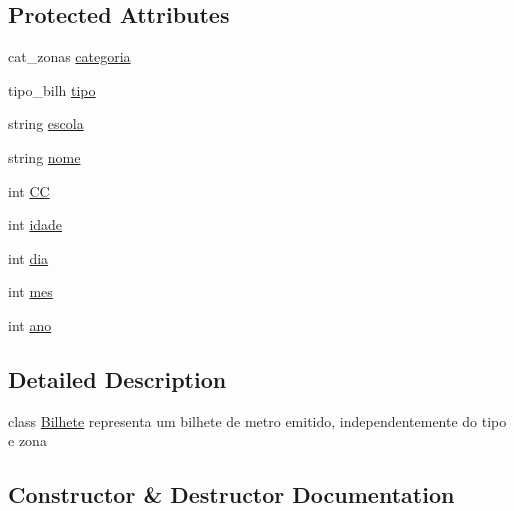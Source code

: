 \subsection*{Protected Attributes}
\begin{DoxyCompactItemize}
\item 
cat\+\_\+zonas \mbox{\hyperlink{class_bilhete_a964746f80b1342fc53512073b5588c1a}{categoria}}
\item 
tipo\+\_\+bilh \mbox{\hyperlink{class_bilhete_a811d01c91c9ca7e43ca05b4de7cb053d}{tipo}}
\item 
string \mbox{\hyperlink{class_bilhete_a5129f08ea3f4b9ec1c77be2b5377c32f}{escola}}
\item 
string \mbox{\hyperlink{class_bilhete_a6c473f8854c6980af895803cfe742279}{nome}}
\item 
int \mbox{\hyperlink{class_bilhete_a3272957b6efbae819c70320b40823e46}{CC}}
\item 
int \mbox{\hyperlink{class_bilhete_a5cd410905c9eeb3e0281df97ddc6b69a}{idade}}
\item 
int \mbox{\hyperlink{class_bilhete_ad3dbd72118947c8ebb9d2a1a9e6bc3eb}{dia}}
\item 
int \mbox{\hyperlink{class_bilhete_ad654ce2fb56eca0738e6994774bb9d75}{mes}}
\item 
int \mbox{\hyperlink{class_bilhete_a28c57c28b91d9d751cb8292911af4b00}{ano}}
\end{DoxyCompactItemize}


\subsection{Detailed Description}
class \mbox{\hyperlink{class_bilhete}{Bilhete}} representa um bilhete de metro emitido, independentemente do tipo e zona 

\subsection{Constructor \& Destructor Documentation}
\mbox{\label{class_bilhete_a474406ccf54268b9206c936be473a15d}} 
